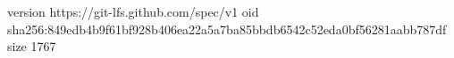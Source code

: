 version https://git-lfs.github.com/spec/v1
oid sha256:849edb4b9f61bf928b406ea22a5a7ba85bbdb6542c52eda0bf56281aabb787df
size 1767
